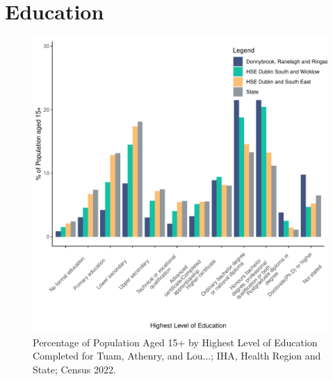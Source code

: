 \documentclass{article}
\begin{document}
\section{Education}\label{sect:Edu}
\begin{figure}[H]
	\centering
	\includegraphics[width = 120mm]{../figures/EduED.pdf}
	\caption{Percentage of Population Aged 15+ by Highest Level of Education Completed for Tuam, Athenry, and Lou...; IHA, Health Region and State; Census 2022.}
	\label{fig:vbnv}
	\end{figure}
\end{document}
